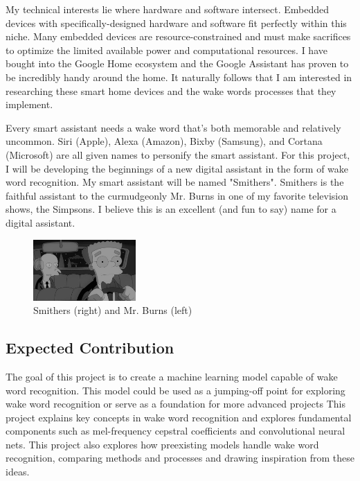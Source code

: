 \documentclass[conference]{IEEEtran}
\begin{document}
My technical interests lie where hardware and software intersect.
Embedded devices with specifically-designed hardware and software
fit perfectly within this niche.
Many embedded devices are resource-constrained and must make sacrifices
to optimize the limited available power and computational resources.
I have bought into the Google Home ecosystem and the Google Assistant 
has proven to be incredibly handy around the home.
It naturally follows that I am interested in researching these smart home devices
and the wake words processes that they implement.

Every smart assistant needs a wake word that's both memorable and relatively uncommon.
Siri (Apple), Alexa (Amazon), Bixby (Samsung), and Cortana (Microsoft)
are all given names to personify the smart assistant.
For this project, I will be developing the beginnings of a new digital assistant
in the form of wake word recognition.
My smart assistant will be named "Smithers".
Smithers is the faithful assistant to the curmudgeonly Mr. Burns 
in one of my favorite television shows, the Simpsons.
I believe this is an excellent (and fun to say) name for a digital assistant.

\begin{figure}[htbp]
    \centerline{\includegraphics[width=0.35\textwidth]{figs/smithers.jpg}}
    \caption{Smithers (right) and Mr. Burns (left)}
    \label{fig:1}
\end{figure}

\subsection{Expected Contribution}
The goal of this project is to create a machine learning model capable of wake word recognition.
This model could be used as a jumping-off point for exploring wake word recognition
or serve as a foundation for more advanced projects
This project explains key concepts in wake word recognition
and explores fundamental components such as mel-frequency cepstral coefficients and convolutional neural nets.
This project also explores how preexisting models handle wake word recognition,
comparing methods and processes and drawing inspiration from these ideas.
\end{document}
